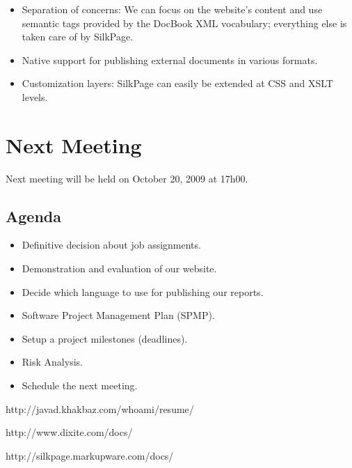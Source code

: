 \documentclass[a4paper, 12pt]{article}
\begin{document}
\begin{itemize}
\item Separation of concerns: We can focus on the website's content 
  and use semantic tags provided by the DocBook XML vocabulary; 
  everything else is taken care of by SilkPage.
\item Native support for publishing external documents in various formats.
  \cite{javad-resume} \cite{dixite-docs}
\item Customization layers: SilkPage can easily be extended at CSS and
  XSLT levels.
  \cite{silkpage-docs}

\end{itemize}


\section{Next Meeting}
Next meeting will be held on October 20, 2009 at 17h00.
\subsection{Agenda}
\begin{itemize}
\item Definitive decision about job assignments.
\item Demonstration and evaluation of our website.
\item Decide which language to use for publishing our reports.
\item Software Project Management Plan (SPMP).
\item Setup a project milestones (deadlines).
\item Risk Analysis.
\item Schedule the next meeting.
\end{itemize}
	

\begin{thebibliography}{9}
  http://javad.khakbaz.com/whoami/resume/

  http://www.dixite.com/docs/
  
  http://silkpage.markupware.com/docs/
  
\end{thebibliography}
	
\end{document}

